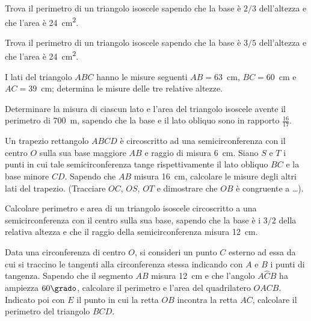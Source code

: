 \begin{multicols}{2}
\begin{esercizio}
\label{ese:7.80}
Trova il perimetro di un triangolo isoscele sapendo che la base è 
\(2/3\) dell'altezza e che l'area è 24~cm\textsuperscript{2}.
\end{esercizio}

\begin{esercizio}
\label{ese:7.81}
Trova il perimetro di un triangolo isoscele sapendo che la base è 
\(3/5\) dell'altezza e che l'area è 24~cm\textsuperscript{2}.
\end{esercizio}

\begin{esercizio}
\label{ese:7.82}
I lati del triangolo \(ABC\) hanno le misure seguenti \(AB=63\)~cm, 
\(BC=60\)~cm e \(AC=39\)~cm; determina le misure delle tre relative 
altezze.
\end{esercizio}

\begin{esercizio}
\label{ese:7.83}
Determinare la misura di ciascun lato e l'area del triangolo isoscele 
avente il perimetro di 700~m, sapendo che la base e il lato obliquo 
sono in rapporto \(\frac{16}{17}\).
\end{esercizio}

\begin{esercizio}
\label{ese:7.84}
Un trapezio rettangolo \(ABCD\) è circoscritto ad una semicirconferenza 
con il centro \(O\) sulla sua base maggiore \(AB\) e raggio di misura 
6~cm. Siano \(S\) e \(T\) i punti in cui tale semicirconferenza tange 
rispettivamente il lato obliquo \(BC\) e la base minore \(CD\). Sapendo 
che \(AB\) misura 16~cm, calcolare le misure degli altri lati del 
trapezio. (Tracciare \(OC\), \(OS\), \(OT\) e dimostrare che \(OB\) è 
congruente a \ldots{}).
\end{esercizio}

\begin{esercizio}
\label{ese:7.85}
Calcolare perimetro e area di un triangolo isoscele circoscritto a 
una semicirconferenza con il centro sulla sua base, sapendo che la 
base è i \(3/2\) della relativa altezza e che il raggio della 
semicirconferenza misura 12~cm.
\end{esercizio}

\begin{esercizio}
\label{ese:7.86}
Data una circonferenza di centro \(O\), si consideri un punto \(C\) 
esterno ad essa da cui si traccino le tangenti alla circonferenza 
stessa indicando con \(A\) e \(B\) i punti di tangenza. Sapendo che il 
segmento \(AB\) misura 12~cm e che l'angolo \(A\widehat{C}B\) ha ampiezza 
\(60\grado\), calcolare il perimetro e l'area del quadrilatero \(OACB\). 
Indicato poi con \(E\) il punto in cui la retta \(OB\) incontra la retta 
\(AC\), calcolare il perimetro del triangolo \(BCD\).
\end{esercizio}


\end{multicols}
